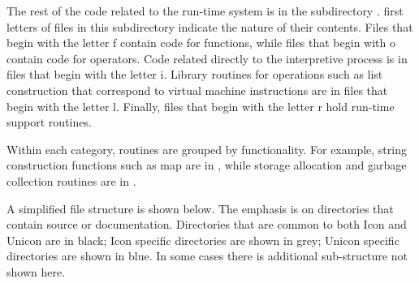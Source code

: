 The rest of the code related to the run-time system is in the subdirectory
. first letters of files in this subdirectory indicate the
nature of their contents. Files that begin with the letter f contain code
for functions, while files that begin with o contain code for
operators. Code related directly to the interpretive process is in files
that begin with the letter i. {\textquotedbl}Library{\textquotedbl}
routines for operations such as list construction that correspond to
virtual machine instructions are in files that begin with the letter
l. Finally, files that begin with the letter r hold run-time support
routines.

Within each category, routines are grouped by functionality. For
example, string construction functions such as map are in ,
while storage allocation and garbage collection routines are in
.

A simplified file structure is shown below. The emphasis is on
directories that contain source or documentation. Directories that are
common to both Icon and Unicon are in black; Icon specific directories are
shown in grey; Unicon specific directories are shown in blue.
In some cases there is additional sub-structure not shown here.

